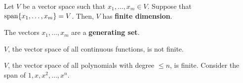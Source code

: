 \begin{definition}
	Let \( V \) be a vector space such that \( x_{1},\ldots ,x_m \in V \). Suppose that \( \operatorname{span} \{x_{1},\ldots ,x_m\} =V  \). Then, \( V \) has \textbf{finite dimension}.
\end{definition}

\begin{definition}
	The vectors \( x_{1},\ldots ,x_m \) are a \textbf{generating set}.
\end{definition}

\begin{eg}
	\( V \), the vector space of all continuous functions, is not finite.
\end{eg}
\begin{eg}
	\( V \), the vector space of all polynomials with degree \( \le n \), is finite. Consider the span of \( 1,x,x^{2},\ldots ,x^{n}   \).
\end{eg}
